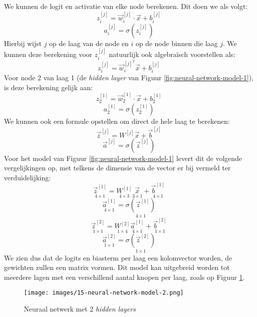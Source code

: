 \noindent
We kunnen de logit en activatie van elke node berekenen. Dit doen we als volgt:
\begin{equation}
	z_{i}^{[j]} = \vec{w}_{i}^{[j]} \cdot \vec{x} + b_{i}^{[j]}
\end{equation}
\begin{equation}
	a_{i}^{[j]} = \sigma(z_{i}^{[j]})
\end{equation}
\noindent
Hierbij wijst $j$ op de laag van de node en $i$ op de node binnen die laag $j$. We kunnen deze berekening voor $z_{i}^{[j]}$ natuurlijk ook algebraïsch voorstellen als:
\begin{equation}
	z_{i}^{[j]} = \vec{w}_{i}^{[j]^{T}} \vec{x} + b_{i}^{[j]}
\end{equation}
\noindent
Voor node 2 van laag 1 (de \textit{hidden layer} van Figuur \ref{fig:neural-network-model-1}), is deze berekening gelijk aan:
\begin{equation*}
	z_{2}^{[1]} = \vec{w}_{2}^{[1]} \cdot \vec{x} + b_{2}^{[1]}
\end{equation*}
\begin{equation*}
	a_{2}^{[1]} = \sigma(z_{2}^{[1]})
\end{equation*}
We kunnen ook een formule opstellen om direct de hele laag te berekenen:
\begin{equation}
	\vec{z}^{[j]} = W^{[j]} \vec{x} + \vec{b}^{[j]}
\end{equation}
\begin{equation}
	\vec{a}^{[j]} = \sigma(\vec{z}^{[j]})
\end{equation}
\noindent
Voor het model van Figuur \ref{fig:neural-network-model-1} levert dit de volgende vergelijkingen op, met telkens de dimensie van de vector er bij vermeld ter verduidelijking:
\begin{equation*}
	\underset{4\times1}{\vec{z}^{[1]}} = \underset{4\times3}{W^{[1]}} \underset{3\times1}{\vec{x}} + \underset{4\times1}{\vec{b}^{[1]}}
\end{equation*}
\begin{equation*}
	\underset{4\times1}{\vec{a}^{[1]}} = \underset{4\times1}{\sigma(\vec{z}^{[1]})}
\end{equation*}
\begin{equation*}
	\underset{1\times1}{\vec{z}^{[2]}} = \underset{1\times4}{W^{[2]}} \underset{4\times1}{\vec{a}^{[1]}} + \underset{1\times1}{\vec{b}^{[2]}}
\end{equation*}
\begin{equation*}
	\underset{1\times1}{\vec{a}^{[2]}} = \underset{1\times1}{\sigma(\vec{z}^{[2]}) }
\end{equation*}
\noindent
We zien dus dat de logits en biasterm per laag een kolomvector worden, de gewichten zullen een matrix vormen.
Dit model kan uitgebreid worden tot meerdere lagen met een verschillend aantal knopen per laag, zoals op Figuur \ref{fig:neural-network-model-2}.
\begin{figure}[h]
	\centering
	\texttt{[image: images/15-neural-network-model-2.png]}
	\caption{Neuraal netwerk met 2 \textit{hidden layers}}
	\label{fig:neural-network-model-2}
\end{figure}

